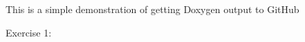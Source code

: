 This is a simple demonstration of getting Doxygen output to Git\+Hub

Exercise 1\+: 
\begin{DoxyCodeInclude}
\end{DoxyCodeInclude}
 